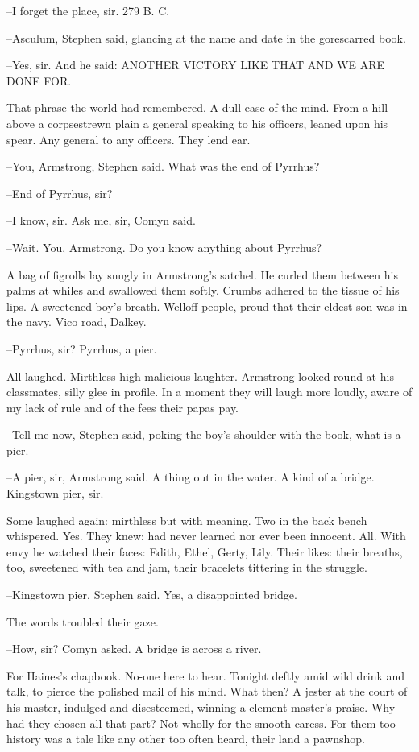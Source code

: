 --I forget the place, sir. 279 B. C.

--Asculum, Stephen said, glancing at the name and date in the gorescarred
book.

--Yes, sir. And he said: ANOTHER VICTORY LIKE THAT AND WE ARE DONE FOR.

That phrase the world had remembered. A dull ease of the mind. From a
hill above a corpsestrewn plain a general speaking to his officers,
leaned upon his spear. Any general to any officers. They lend ear.

--You, Armstrong, Stephen said. What was the end of Pyrrhus?

--End of Pyrrhus, sir?

--I know, sir. Ask me, sir, Comyn said.

--Wait. You, Armstrong. Do you know anything about Pyrrhus?

A bag of figrolls lay snugly in Armstrong's satchel. He curled them
between his palms at whiles and swallowed them softly. Crumbs adhered to
the tissue of his lips. A sweetened boy's breath. Welloff people, proud
that their eldest son was in the navy. Vico road, Dalkey.

--Pyrrhus, sir? Pyrrhus, a pier.

All laughed. Mirthless high malicious laughter. Armstrong looked round at
his classmates, silly glee in profile. In a moment they will laugh more
loudly, aware of my lack of rule and of the fees their papas pay.

--Tell me now, Stephen said, poking the boy's shoulder with the book,
what is a pier.

--A pier, sir, Armstrong said. A thing out in the water. A kind of a
bridge. Kingstown pier, sir.

Some laughed again: mirthless but with meaning. Two in the back bench
whispered. Yes. They knew: had never learned nor ever been innocent. All.
With envy he watched their faces: Edith, Ethel, Gerty, Lily. Their likes:
their breaths, too, sweetened with tea and jam, their bracelets tittering
in the struggle.

--Kingstown pier, Stephen said. Yes, a disappointed bridge.

The words troubled their gaze.

--How, sir? Comyn asked. A bridge is across a river.

For Haines's chapbook. No-one here to hear. Tonight deftly amid wild
drink and talk, to pierce the polished mail of his mind. What then? A
jester at the court of his master, indulged and disesteemed, winning a
clement master's praise. Why had they chosen all that part? Not wholly
for the smooth caress. For them too history was a tale like any other too
often heard, their land a pawnshop.

